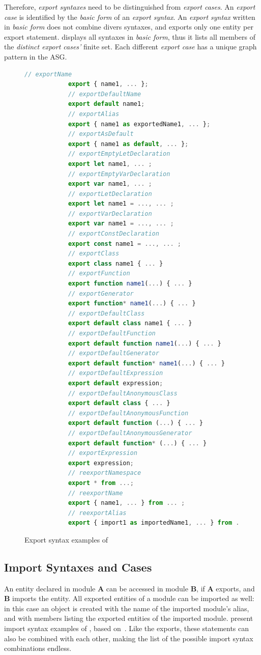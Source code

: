 Therefore, \emph{export syntaxes} need to be distinguished from \emph{export cases}. An \emph{export case} is identified by the \emph{basic form} of an \emph{export syntax}. An \emph{export syntax} written in \emph{basic form} does not combine divers syntaxes, and exports only one entity per export statement.  displays all syntaxes in \emph{basic form}, thus it lists all members of the \emph{distinct export cases'} finite set. Each different \emph{export case} has a unique graph pattern in the ASG.

\begin{figure}[!p]
	\centering
	\begin{lstlisting}[language=JavaScript]
			// exportName
			export { name1, ... };
			// exportDefaultName
			export default name1;
			// exportAlias
			export { name1 as exportedName1, ... };
			// exportAsDefault
			export { name1 as default, ... };
			// exportEmptyLetDeclaration
			export let name1, ... ;
			// exportEmptyVarDeclaration
			export var name1, ... ;
			// exportLetDeclaration
			export let name1 = ..., ... ;
			// exportVarDeclaration
			export var name1 = ..., ... ;
			// exportConstDeclaration
			export const name1 = ..., ... ;
			// exportClass
			export class name1 { ... }
			// exportFunction
			export function name1(...) { ... }
			// exportGenerator
			export function* name1(...) { ... }
			// exportDefaultClass
			export default class name1 { ... }
			// exportDefaultFunction
			export default function name1(...) { ... }
			// exportDefaultGenerator
			export default function* name1(...) { ... }
			// exportDefaultExpression
			export default expression;
			// exportDefaultAnonymousClass
			export default class { ... }
			// exportDefaultAnonymousFunction
			export default function (...) { ... }
			// exportDefaultAnonymousGenerator
			export default function* (...) { ... }
			// exportExpression
			export expression;
			// reexportNamespace
			export * from ...;
			// reexportName
			export { name1, ... } from ... ;
			// reexportAlias
			export { import1 as importedName1, ... } from ...;
	\end{lstlisting}
  \caption{Export syntax examples of }
  \label{fig:export-syntaxes}
\end{figure}


\subsection{Import Syntaxes and Cases}

An entity declared in module \textbf{A} can be accessed in module \textbf{B}, if \textbf{A} exports, and \textbf{B} imports the entity. All exported entities of a module can be imported as well: in this case an object is created with the name of the imported module's alias, and with members listing the exported entities of the imported module.  present import syntax examples of , based on~\cite{import-syntaxes}. Like the exports, these statements can also be combined with each other, making the list of the possible import syntax combinations endless.

